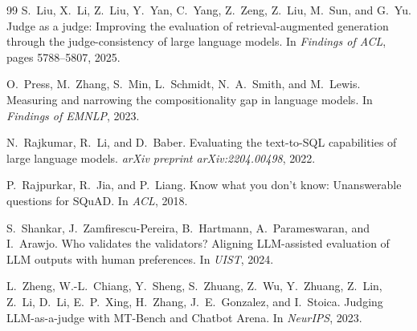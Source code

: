 \documentclass[11pt,a4paper]{article}
\begin{document}
\begin{thebibliography}{99}
S.~Liu, X.~Li, Z.~Liu, Y.~Yan, C.~Yang, Z.~Zeng, Z.~Liu, M.~Sun, and G.~Yu.
\newblock Judge as a judge: Improving the evaluation of retrieval-augmented generation through the judge-consistency of large language models.
\newblock In \emph{Findings of ACL}, pages 5788--5807, 2025.

O.~Press, M.~Zhang, S.~Min, L.~Schmidt, N.~A.~Smith, and M.~Lewis.
\newblock Measuring and narrowing the compositionality gap in language models.
\newblock In \emph{Findings of EMNLP}, 2023.

N.~Rajkumar, R.~Li, and D.~Baber.
\newblock Evaluating the text-to-{SQL} capabilities of large language models.
\newblock \emph{arXiv preprint arXiv:2204.00498}, 2022.

P.~Rajpurkar, R.~Jia, and P.~Liang.
\newblock Know what you don't know: Unanswerable questions for {SQuAD}.
\newblock In \emph{ACL}, 2018.

S.~Shankar, J.~Zamfirescu-Pereira, B.~Hartmann, A.~Parameswaran, and I.~Arawjo.
\newblock Who validates the validators? {A}ligning {LLM}-assisted evaluation of {LLM} outputs with human preferences.
\newblock In \emph{UIST}, 2024.

L.~Zheng, W.-L.~Chiang, Y.~Sheng, S.~Zhuang, Z.~Wu, Y.~Zhuang, Z.~Lin, Z.~Li, D.~Li, E.~P.~Xing, H.~Zhang, J.~E.~Gonzalez, and I.~Stoica.
\newblock Judging {LLM}-as-a-judge with {MT-Bench} and {Chatbot Arena}.
\newblock In \emph{NeurIPS}, 2023.

\end{thebibliography}
\end{document}
